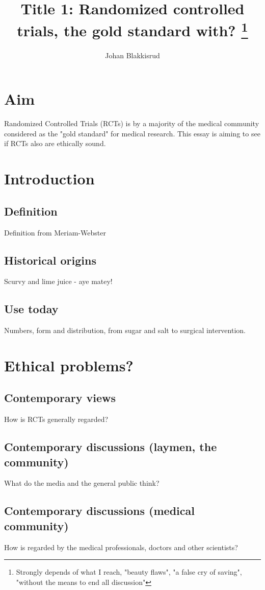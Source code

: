 \documentclass[12p]{article}
\title{Title 1: Randomized controlled trials, the gold standard with?
  \footnote{Strongly depends of what I reach, "beauty flaws", "a false cry of saving", "without the means to end all discussion"}
}
\author{Johan Blakkisrud}
\begin{document}
\maketitle

\section*{Aim}

Randomized Controlled Trials (RCTs) is by a majority of the medical community considered as the "gold standard" for medical research.
This essay is aiming to see if RCTs also are ethically sound.

\section*{Introduction}

\subsection*{Definition}

Definition from Meriam-Webster
\subsection*{Historical origins}
Scurvy and lime juice - aye matey!
\subsection*{Use today}
Numbers, form and distribution, from sugar and salt to surgical intervention.
\section*{Ethical problems?}
\subsection*{Contemporary views}
How is RCTs generally regarded?
\subsection*{Contemporary discussions (laymen, the community)}
What do the media and the general public think?
\subsection*{Contemporary discussions (medical community)}
How is regarded by the medical professionals, doctors and other scientists?
\end{document}
